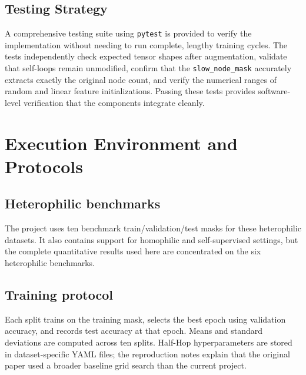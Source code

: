 \documentclass[conference]{IEEEtran}
\begin{document}
\subsection{Testing Strategy}
A comprehensive testing suite using \texttt{pytest} is provided to verify the implementation without needing to run complete, lengthy training cycles. The tests independently check expected tensor shapes after augmentation, validate that self-loops remain unmodified, confirm that the \texttt{slow\_node\_mask} accurately extracts exactly the original node count, and verify the numerical ranges of random and linear feature initializations. Passing these tests provides software-level verification that the components integrate cleanly.

\section{Execution Environment and Protocols}
\subsection{Heterophilic benchmarks}
\begin{table}[H]
\centering\small
\caption{Benchmark statistics used in the supervised reproduction.}
\label{tab:datasets}
\end{table}

The project uses ten benchmark train/validation/test masks for these heterophilic datasets. It also contains support for homophilic and self-supervised settings, but the complete quantitative results used here are concentrated on the six heterophilic benchmarks.

\subsection{Training protocol}
Each split trains on the training mask, selects the best epoch using validation accuracy, and records test accuracy at that epoch. Means and standard deviations are computed across ten splits. Half-Hop hyperparameters are stored in dataset-specific YAML files; the reproduction notes explain that the original paper used a broader baseline grid search than the current project.
\end{document}
